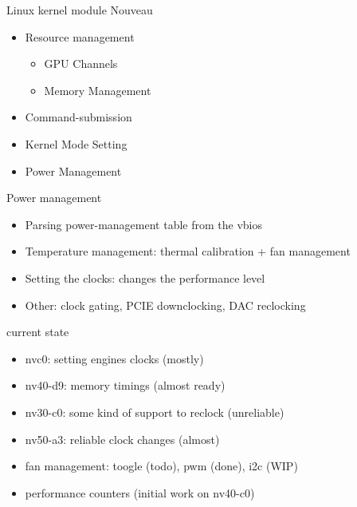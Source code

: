 \documentclass[11pt,english,compress]{beamer}
\begin{document}
		\begin{frame}
			\begin{block}{Linux kernel module Nouveau}
				\begin{itemize}
					\item Resource management
						\begin{itemize}
							\item GPU Channels
							\item Memory Management
						\end{itemize}
					\item Command-submission
					\item Kernel Mode Setting
					\item Power Management
				\end{itemize}
			\end{block}
		\end{frame}

		\begin{frame}
			\begin{block}{Power management}
 				\begin{itemize}
					\item Parsing power-management table from the vbios
					\item Temperature management: thermal calibration + fan management
					\item Setting the clocks: changes the performance level
					\item Other: clock gating, PCIE downclocking, DAC reclocking
				\end{itemize}
			\end{block}

			\begin{block}{current state}
				\begin{itemize}
					\item nvc0: setting engines clocks (mostly)
					\item nv40-d9: memory timings (almost ready)
					\item nv30-c0: some kind of support to reclock (unreliable)
					\item nv50-a3: reliable clock changes (almost)
					\item fan management: toogle (todo), pwm (done), i2c (WIP)
					\item performance counters (initial work on nv40-c0)
				\end{itemize}
			\end{block}
		\end{frame}
\end{document}
